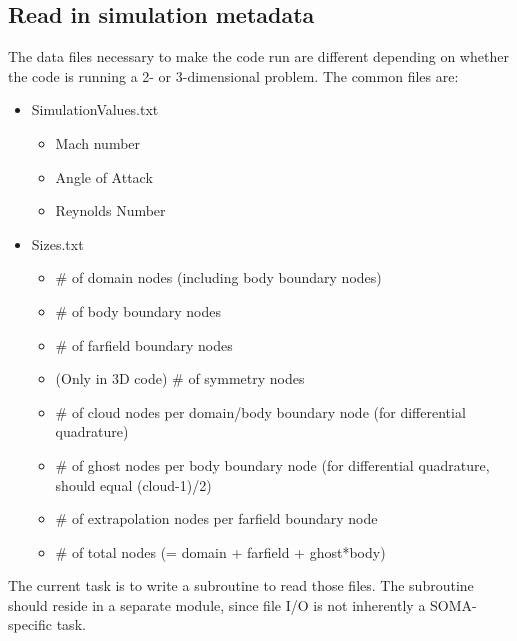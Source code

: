 \documentclass[12pt]{article}
\begin{document}
    \subsection*{Read in simulation metadata}
        The data files necessary to make the code run are different depending on whether the code is running a 2- or 3-dimensional problem. The common files are:
        \begin{itemize}
            \item SimulationValues.txt
            \begin{itemize}
                \item Mach number
                \item Angle of Attack
                \item Reynolds Number
            \end{itemize}
            \item Sizes.txt
            \begin{itemize}
                \item \# of domain nodes (including body boundary nodes)
                \item \# of body boundary nodes
                \item \# of farfield boundary nodes
                \item (Only in 3D code) \# of symmetry nodes
                \item \# of cloud nodes per domain/body boundary node (for differential quadrature)
                \item \# of ghost nodes per body boundary node (for differential quadrature, should equal (cloud-1)/2)
                \item \# of extrapolation nodes per farfield boundary node
                \item \# of total nodes (= domain + farfield + ghost*body)
            \end{itemize}
        \end{itemize}
    
    The current task is to write a subroutine to read those files. The subroutine should reside in a separate module, since file I/O is not inherently a SOMA-specific task.
\end{document}
